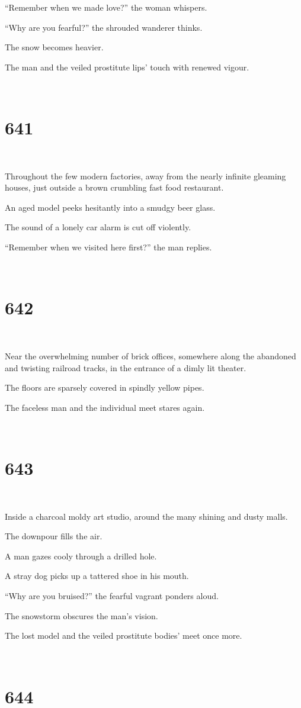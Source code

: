 \documentclass{report}
\begin{document}
``Remember when we made love?'' the woman whispers.

``Why are you fearful?'' the shrouded wanderer thinks.

The snow becomes heavier.

The man and the veiled prostitute lips' touch with renewed vigour.

~
\chapter*{641}
~

Throughout the few modern factories, away from the nearly infinite gleaming houses, just outside a brown crumbling fast food restaurant.

An aged model peeks hesitantly into a smudgy beer glass.

The sound of a lonely car alarm is cut off violently.

``Remember when we visited here first?'' the man replies.

~
\chapter*{642}
~

Near the overwhelming number of brick offices, somewhere along the abandoned and twisting railroad tracks, in the entrance of a dimly lit theater.

The floors are sparsely covered in spindly yellow pipes.

The faceless man and the individual meet stares again.

~
\chapter*{643}
~

Inside a charcoal moldy art studio, around the many shining and dusty malls.

The downpour fills the air.

A man gazes cooly through a drilled hole.

A stray dog picks up a tattered shoe in his mouth.

``Why are you bruised?'' the fearful vagrant ponders aloud.

The snowstorm obscures the man's vision.

The lost model and the veiled prostitute bodies' meet once more.

~
\chapter*{644}
~
\end{document}

